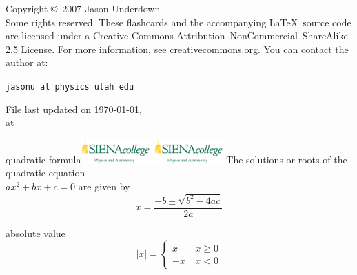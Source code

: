 \documentclass[avery5371,grid]{flashcards}
\begin{document}
\begin{flashcard}{Copyright \copyright \, 2007 Jason Underdown \\
Some rights reserved.}
These flashcards and the accompanying \LaTeX \, source code are licensed
under a Creative Commons Attribution--NonCommercial--ShareAlike 2.5 License.  
For more information, see creativecommons.org.  You can contact the author at:
\begin{center}
\begin{small}\tt jasonu at physics utah edu\end{small}

\medskip
File last updated on \today, \\
at \currenttime
\end{center}
\end{flashcard}

\begin{flashcard}[Stuff]{quadratic formula\hfill \includegraphics[width=0.2\textwidth]{siena_phys_astro_print_crop.jpg}}
\includegraphics[width=0.2\textwidth]{siena_phys_astro_print_crop.jpg}
The solutions or roots of the quadratic equation \\
$ax^2 + bx + c = 0$ are given by
\begin{equation*}
x = \dfrac{-b\pm \sqrt{b^2-4ac}}{2a}
\end{equation*}
\end{flashcard}

\begin{flashcard}[Definition]{absolute value}
\begin{equation*}
|x| = \left\{ \begin{array}{ll}
x & \: x \geq 0 \\
-x & \: x < 0
\end{array} \right.
\end{equation*}
\end{flashcard}
\end{document}
